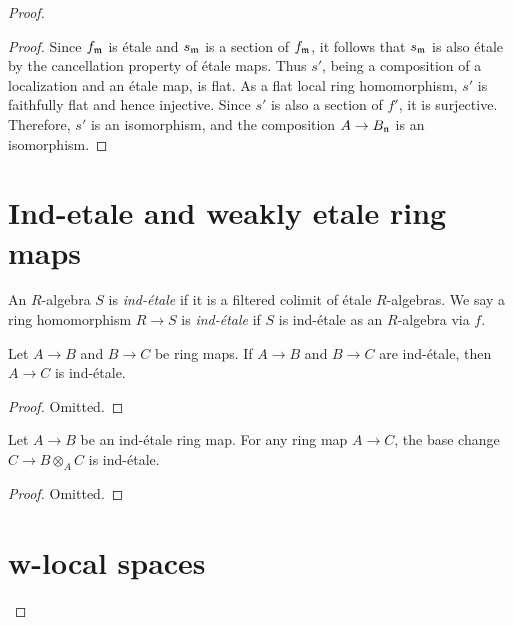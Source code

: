 \begin{proof}
\begin{proof}
  Since \(f_{\mathfrak{m}}\) is étale and \(s_{\mathfrak{m}}\) is a section of \(f_{\mathfrak{m}}\), it follows that \(s_{\mathfrak{m}}\) is also étale by the cancellation property of étale maps. Thus \(s'\), being a composition of a localization and an étale map, is flat. As a flat local ring homomorphism, \(s'\) is faithfully flat and hence injective. Since \(s'\) is also a section of \(f'\), it is surjective. Therefore, \(s'\) is an isomorphism, and the composition \(A \to B_{\mathfrak{n}}\) is an isomorphism.
\end{proof}

\section{Ind-etale and weakly etale ring maps}

\begin{definition}
    An $R$-algebra $S$ is \emph{ind-étale} if it is a filtered colimit of étale $R$-algebras.
    We say a ring homomorphism $R \to S$ is \emph{ind-étale} if $S$ is ind-étale as an $R$-algebra via $f$.
    \label{def:ind-etale}
\end{definition}

\begin{lemma}
  \label{thm:ind-etale-comp}
  Let $A \to B$ and $B \to C$ be ring maps. If $A \to B$ and $B \to C$ are ind-étale, then $A \to C$ is ind-étale.
\end{lemma}

\begin{proof}
  Omitted.
\end{proof}

\begin{lemma}
  \label{thm:ind-etale-base-change}
  Let $A \to B$ be an ind-étale ring map. For any ring map $A \to C$, the base change $C \to B \otimes_A C$ is ind-étale.
\end{lemma}

\begin{proof}
  Omitted.
\end{proof}

\section{w-local spaces}


\end{proof}
